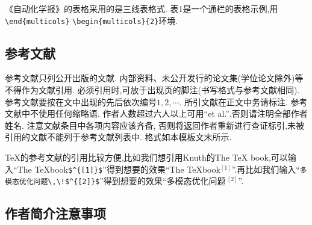 \documentclass[fontset=mac]{aas}
\begin{document}
《自动化学报》的表格采用的是三线表格式.
表1是一个通栏的表格示例,用\verb|\end{multicols}|
\verb|\begin{multicols}{2}|环境.

\subsection{参考文献}

参考文献只列公开出版的文献.
内部资料、未公开发行的论文集(学位论文除外)等不得作为文献引用.
必须引用时,可放于出现页的脚注(书写格式与参考文献相同).
参考文献要按在文中出现的先后依次编号$1,2, \cdots$.
所引文献在正文中务请标注. 参考文献中不使用任何缩略语.
作者人数超过六人以上可用``et al.'',否则请注明全部作者姓名.
注意文献条目中各项内容应该齐备,
否则将返回作者重新进行查证标引,未被引用的文献不能列于参考文献列表中.
格式如本模板文末所示\cite{1}.

\TeX 的参考文献的引用比较方便,比如我们想引用Knuth的The \TeX
book,可以输入``The \TeX book\verb|$^{[1]}$|''得到想要的效果``The
\TeX book$^{[1]}$''.再比如我们输入``\verb|多模态优化问题\,\!$^{[2]}$|''得到想要的效果``多模态优化问题\,\!$^{[2]}$''.

\subsection{作者简介注意事项}
\end{document}
